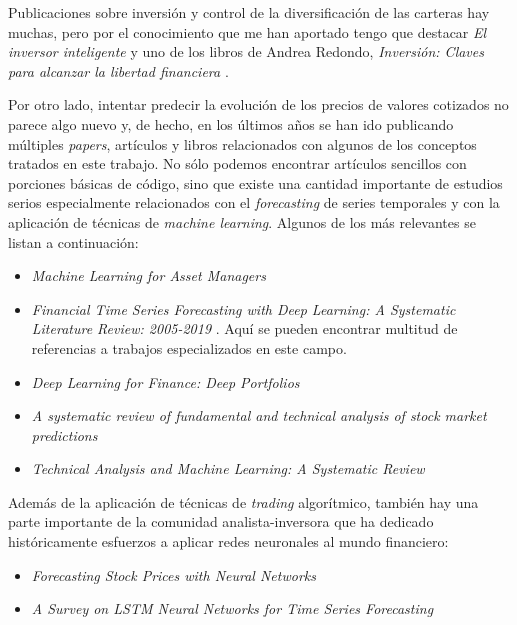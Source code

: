 
Publicaciones sobre inversión y control de la diversificación de las carteras hay muchas, pero por el conocimiento que me han aportado tengo que destacar \emph{El inversor inteligente} \citep{book:Inversor_inteligente} y uno de los libros de Andrea Redondo, \emph{Inversión: Claves para alcanzar la libertad financiera} \citep{book:libertad_financiera}.

Por otro lado, intentar predecir la evolución de los precios de valores cotizados no parece algo nuevo y, de hecho, en los últimos años se han ido publicando múltiples \emph{papers}, artículos y libros relacionados con algunos de los conceptos tratados en este trabajo. No sólo podemos encontrar artículos sencillos con porciones básicas de código, sino que existe una cantidad importante de estudios serios especialmente relacionados con el \emph{forecasting} de series temporales y con la aplicación de técnicas de \emph{machine learning}. Algunos de los más relevantes se listan a continuación:

\begin{itemize}
\tightlist
\item \emph{Machine Learning for Asset Managers} \citep{paper:ML_Asset_Managers}
\item \emph{Financial Time Series Forecasting with Deep Learning: A Systematic Literature Review: 2005-2019} \citep{paper:Deep_Learning_Review}. Aquí se pueden encontrar multitud de referencias a trabajos especializados en este campo. 
\item \emph{Deep Learning for Finance: Deep Portfolios} \citep{paper:Deep_Portfolios}
\item \emph{A systematic review of fundamental and technical analysis of stock market predictions} \citep{paper:fund_and_tech_analysis}
\item \emph{Technical Analysis and Machine Learning: A Systematic Review} \citep{paper:Technical_Analysis_ML}
\end{itemize}

Además de la aplicación de técnicas de \emph{trading} algorítmico, también hay una parte importante de la comunidad analista-inversora que ha dedicado históricamente esfuerzos a aplicar redes neuronales al mundo financiero:

\begin{itemize}
\tightlist
\item \emph{Forecasting Stock Prices with Neural Networks} \citep{paper:Forecasting_NN}
\item \emph{A Survey on LSTM Neural Networks for Time Series Forecasting} \citep{paper:LSTM_Survey}
\end{itemize}

